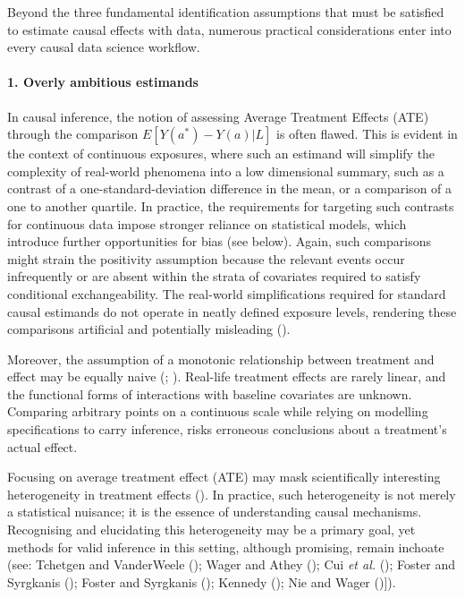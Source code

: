 \documentclass[
  singlecolumn,
  9pt]{article}
\let\oldparagraph\paragraph
\renewcommand{\paragraph}[1]{\oldparagraph{#1}\mbox{}}
\begin{document}
Beyond the three fundamental identification assumptions that must be
satisfied to estimate causal effects with data, numerous practical
considerations enter into every causal data science workflow.

\paragraph{1. Overly ambitious
estimands}\label{overly-ambitious-estimands}

In causal inference, the notion of assessing Average Treatment Effects
(ATE) through the comparison \(E[Y(a^*) - Y(a)|L]\) is often flawed.
This is evident in the context of continuous exposures, where such an
estimand will simplify the complexity of real-world phenomena into a low
dimensional summary, such as a contrast of a one-standard-deviation
difference in the mean, or a comparison of a one to another quartile. In
practice, the requirements for targeting such contrasts for continuous
data impose stronger reliance on statistical models, which introduce
further opportunities for bias (see below). Again, such comparisons
might strain the positivity assumption because the relevant events occur
infrequently or are absent within the strata of covariates required to
satisfy conditional exchangeability. The real-world simplifications
required for standard causal estimands do not operate in neatly defined
exposure levels, rendering these comparisons artificial and potentially
misleading ().

Moreover, the assumption of a monotonic relationship between treatment
and effect may be equally naive (; ). Real-life treatment effects are rarely linear, and the
functional forms of interactions with baseline covariates are unknown.
Comparing arbitrary points on a continuous scale while relying on
modelling specifications to carry inference, risks erroneous conclusions
about a treatment's actual effect.

Focusing on average treatment effect (ATE) may mask scientifically
interesting heterogeneity in treatment effects
(). In practice, such
heterogeneity is not merely a statistical nuisance; it is the essence of
understanding causal mechanisms. Recognising and elucidating this
heterogeneity may be a primary goal, yet methods for valid inference in
this setting, although promising, remain inchoate (see: Tchetgen and
VanderWeele (); Wager and Athey
(); Cui \emph{et al.}
(); Foster and Syrgkanis
(); Foster and Syrgkanis
(); Kennedy
(); Nie and Wager
(){]}).
\end{document}
